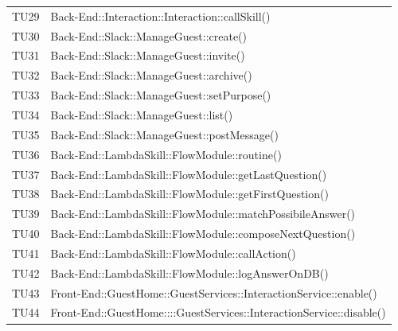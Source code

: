 \documentclass[../PianoDiQualifica.tex]{subfiles}
\begin{document}
\begin{longtable}[c] { >{\centering\arraybackslash}p{3cm} >{\centering\arraybackslash}p{9.5cm}}
			\addlinespace[0.3em]
			\midrule
			\addlinespace[0.3em]
			TU29 & Back-End::Interaction::Interaction::callSkill() \\
			\addlinespace[0.3em]
			\midrule
			\addlinespace[0.3em] 			
			TU30 & Back-End::Slack::ManageGuest::create() \\ 
			\addlinespace[0.3em]
			\midrule
			\addlinespace[0.3em]
			TU31 & Back-End::Slack::ManageGuest::invite() \\ 
			\addlinespace[0.3em]
			\midrule
			\addlinespace[0.3em]
			TU32 & Back-End::Slack::ManageGuest::archive() \\
			\addlinespace[0.3em]
			\midrule
			\addlinespace[0.3em]
			TU33 & Back-End::Slack::ManageGuest::setPurpose() \\
			\addlinespace[0.3em]
			\midrule
			\addlinespace[0.3em]
			TU34 & Back-End::Slack::ManageGuest::list() \\
			\addlinespace[0.3em]
			\midrule
			\addlinespace[0.3em]
			TU35 & Back-End::Slack::ManageGuest::postMessage() \\
			\addlinespace[0.3em]
			\midrule
			\addlinespace[0.3em] 
			TU36 & Back-End::LambdaSkill::FlowModule::routine() \\ 
			\addlinespace[0.3em]
			\midrule
			\addlinespace[0.3em]
			TU37 & Back-End::LambdaSkill::FlowModule::getLastQuestion() \\ 
			\addlinespace[0.3em]
			\midrule
			\addlinespace[0.3em]
			TU38 & Back-End::LambdaSkill::FlowModule::getFirstQuestion() \\
			\addlinespace[0.3em]
			\midrule
			\addlinespace[0.3em]
			TU39 & Back-End::LambdaSkill::FlowModule::matchPossibileAnswer() \\ 
			\addlinespace[0.3em]
			\midrule
			\addlinespace[0.3em]
			TU40 & Back-End::LambdaSkill::FlowModule::composeNextQuestion() \\
			\addlinespace[0.3em]
			\midrule
			\addlinespace[0.3em]
			TU41 & Back-End::LambdaSkill::FlowModule::callAction() \\ 
			\addlinespace[0.3em]
			\midrule
			\addlinespace[0.3em]
			TU42 & Back-End::LambdaSkill::FlowModule::logAnswerOnDB() \\
			\addlinespace[0.3em]
			\midrule
			\addlinespace[0.3em]
			TU43 & Front-End::GuestHome::GuestServices::InteractionService::enable() \\
			\addlinespace[0.3em]
			\midrule
			\addlinespace[0.3em]
			TU44 & Front-End::GuestHome::::GuestServices::InteractionService::disable() \\ 

\end{longtable}
\end{document}
